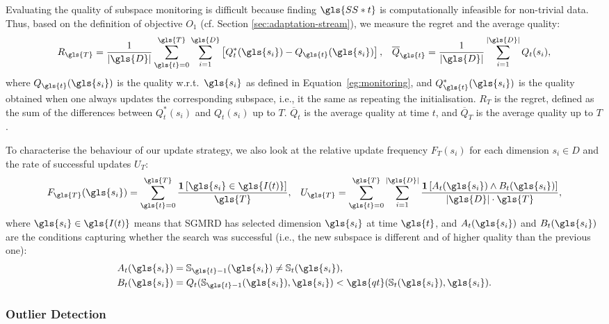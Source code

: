 Evaluating the quality of subspace monitoring is difficult because finding $\gls{SS*t}$ is computationally infeasible for non-trivial data. Thus, based on the definition of objective $O_1$ (cf. Section \ref{sec:adaptation-stream}), we measure the regret and the average quality:
\begin{align}
R_{\gls{T}} = \frac{1}{|\gls{D}|} \sum_{\gls{t}=0}^{{\gls{T}}} \sum_{{i}=1}^{\gls{D}} \left[{Q}_{{t}}^*(\gls{s_i}) - Q_{\gls{t}}(\gls{s_i}) \right], && \overline{Q}_{\gls{t}} = \frac{1}{|\gls{D}|}  \sum_{{i}=1}^{|\gls{D}|} Q_{{t}}(s_i),
\end{align}
where $Q_{\gls{t}}(\gls{s_i})$ is the quality w.r.t.\ $\gls{s_i}$ as defined in Equation~\ref{eg:monitoring}, and ${Q}_{\gls{t}}^*(\gls{s_i})$ is the quality obtained when one always updates the corresponding subspace, i.e., it the same as repeating the initialisation. $R_{{T}}$ is the regret, defined as the sum of the differences between ${Q}_{{t}}^*(s_i)$ and $Q_{{t}}(s_i)$ up to $T$. $\overline{Q}_{{t}}$ is the average quality at time $t$, and $\overline{Q}_{{T}}$ is the average quality up to $T$. 

To characterise the behaviour of our update strategy, we also look at the relative update frequency $F_{{T}}({s_i})$ for each dimension ${s_i} \in {D}$ and the rate of successful updates $U_{{T}}$:
\begin{align}
F_{\gls{T}}(\gls{s_i}) = \sum_{\gls{t}=0}^{{\gls{T}}} \frac{\mathbf{1}\left[\gls{s_i} \in \gls{I(t)}\right]}{\gls{T}}, && U_{\gls{T}} = \sum_{\gls{t}=0}^{{\gls{T}}} \sum_{{i=1}}^{|\gls{D}|} \frac{ \mathbf{1}\left[A_t(\gls{s_i}) \wedge B_t(\gls{s_i})\right]}{|\gls{D}|\cdot {\gls{T}}}, \label{eq:U_T}
\end{align}
where $\gls{s_i} \in \gls{I(t)}$ means that \gls{SGMRD} has selected dimension $\gls{s_i}$ at time $\gls{t}$, and $A_t(\gls{s_i})$ and $B_t(\gls{s_i})$ are the conditions capturing whether the search was successful (i.e., the new subspace is different and of higher quality than the previous one): 
\begin{align}
A_t(\gls{s_i}) &= \mathbb{S}_{{\gls{t}}-1}(\gls{s_i}) \neq \mathbb{S}_t(\gls{s_i}), \\ B_t(\gls{s_i}) &= Q_t(\mathbb{S}_{{\gls{t}}-1}(\gls{s_i}), \gls{s_i}) < \gls{qt}(\mathbb{S}_t(\gls{s_i}), \gls{s_i}).
\end{align}

\subsubsection{Outlier Detection}

